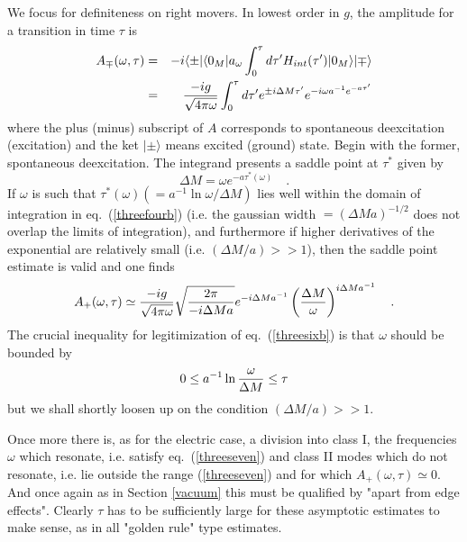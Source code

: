 \documentclass[12pt,oneside]{report}
\def\ket#1{|#1\rangle}
\def\bra#1{\langle #1|}
\def\elematrice#1#2#3{\langle #1|#2|#3 \rangle}
\def\om{\omega	}
\def\p {\prime}
\begin{document}
We focus for definiteness on right
movers. In lowest order in $g$, the amplitude for a transition in time
$\tau$ is \begin{eqnarray}
A_\mp (\om, \tau) &=& -i \bra{\pm} \elematrice{0_M}{ a_\om \int_0^\tau d\tau^\p
H_{int}(\tau^\p) }{0_M}\ket{\mp}\nonumber\\
&=& {-i g \over \sqrt{4 \pi \om}} \int_0^\tau d\tau^\prime
e^{\pm i \Delta M \tau^\prime} e^{-i \om a^{-1} e^{-a \tau^\prime}}
\label{threefourb}
\end{eqnarray}
where  the plus (minus) subscript of $A$ corresponds to  
spontaneous deexcitation
(excitation) and the ket $\ket{\pm}$ means excited (ground) state. Begin
with the former, spontaneous deexcitation. The integrand presents 
a saddle point at $\tau^*$ given by
\begin{equation}
\Delta M = \om e^{-a \tau^*(\om) }
\quad .\label{threefiveb}
\end{equation}
If $\om$ is such that $\tau^*(\om) (=a^{-1} \ln \om / \Delta M)$
lies well within the domain of integration in eq.~(\ref{threefourb}) (i.e. the
gaussian width $ =(\Delta M a)^{-1/2}$ does not overlap the limits of
integration), and furthermore if higher derivatives of the exponential are
relatively small (i.e. $ (\Delta M / a) >>1$), then the saddle point
estimate is valid and one finds \begin{equation}
A_+(\om, \tau) \simeq {-i g \over \sqrt{4 \pi \om}} \sqrt{2 \pi
\over -i \Delta M a}
e^{- i \Delta M a^{-1}} \left ( {\Delta M \over \om} \right)^{i \Delta M
a^{-1}} \quad .\label{threesixb}
\end{equation}
The crucial inequality for legitimization of eq.~(\ref{threesixb}) is 
that $\om$ should be bounded by
\begin{equation}
0 \leq a^{-1} \ln {\om \over \Delta M} \leq \tau
\label{threeseven}
\end{equation}
but we shall shortly loosen up on the condition $
(\Delta M / a) >>1$.

Once more there is, as for the electric case, a division into class I, the
frequencies $\om$
which resonate, i.e. satisfy eq.~(\ref{threeseven}) and class II modes which do
not resonate, i.e. lie outside the range (\ref{threeseven}) and for which
$A_+(\om,\tau)\simeq 0$.  And once again as in Section \ref{vacuum} this must be
qualified by "apart from edge effects". Clearly $\tau$ has to be sufficiently
large for these asymptotic estimates to make sense, as in all "golden rule" type
estimates.
\end{document}
